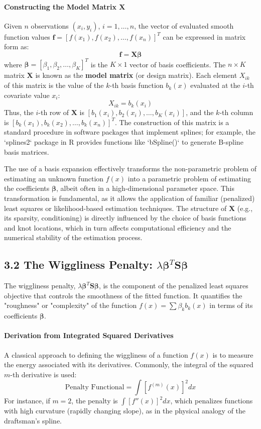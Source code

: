 \documentclass[11pt, a4paper]{article}
\begin{document}
\begin{itemize}
\paragraph{Constructing the Model Matrix $\mathbf{X}$}
Given $n$ observations $(x_i, y_i)$, $i=1, \dots, n$, the vector of evaluated smooth function values $\mathbf{f} = [f(x_1), f(x_2), \dots, f(x_n)]^T$ can be expressed in matrix form as:
\[ \mathbf{f} = \mathbf{X}\boldsymbol{\beta} \]
where $\boldsymbol{\beta} = [\beta_1, \beta_2, \dots, \beta_K]^T$ is the $K \times 1$ vector of basis coefficients. The $n \times K$ matrix $\mathbf{X}$ is known as the \textbf{model matrix} (or design matrix). Each element $X_{ik}$ of this matrix is the value of the $k$-th basis function $b_k(x)$ evaluated at the $i$-th covariate value $x_i$:
\[ X_{ik} = b_k(x_i) \]
Thus, the $i$-th row of $\mathbf{X}$ is $[b_1(x_i), b_2(x_i), \dots, b_K(x_i)]$, and the $k$-th column is $[b_k(x_1), b_k(x_2), \dots, b_k(x_n)]^T$. The construction of this matrix is a standard procedure in software packages that implement splines; for example, the `splines2` package in R provides functions like `bSpline()` to generate B-spline basis matrices.

The use of a basis expansion effectively transforms the non-parametric problem of estimating an unknown function $f(x)$ into a parametric problem of estimating the coefficients $\boldsymbol{\beta}$, albeit often in a high-dimensional parameter space. This transformation is fundamental, as it allows the application of familiar (penalized) least squares or likelihood-based estimation techniques. The structure of $\mathbf{X}$ (e.g., its sparsity, conditioning) is directly influenced by the choice of basis functions and knot locations, which in turn affects computational efficiency and the numerical stability of the estimation process.

\subsection{3.2 The Wiggliness Penalty: $\lambda \boldsymbol{\beta}^T \mathbf{S} \boldsymbol{\beta}$}
The wiggliness penalty, $\lambda \boldsymbol{\beta}^T \mathbf{S} \boldsymbol{\beta}$, is the component of the penalized least squares objective that controls the smoothness of the fitted function. It quantifies the "roughness" or "complexity" of the function $f(x) = \sum \beta_k b_k(x)$ in terms of its coefficients $\boldsymbol{\beta}$.

\paragraph{Derivation from Integrated Squared Derivatives}
A classical approach to defining the wiggliness of a function $f(x)$ is to measure the energy associated with its derivatives. Commonly, the integral of the squared $m$-th derivative is used:
\[ \text{Penalty Functional} = \int [f^{(m)}(x)]^2 dx \]
For instance, if $m=2$, the penalty is $\int [f''(x)]^2 dx$, which penalizes functions with high curvature (rapidly changing slope), as in the physical analogy of the draftsman's spline.


\end{itemize}
\end{document}
